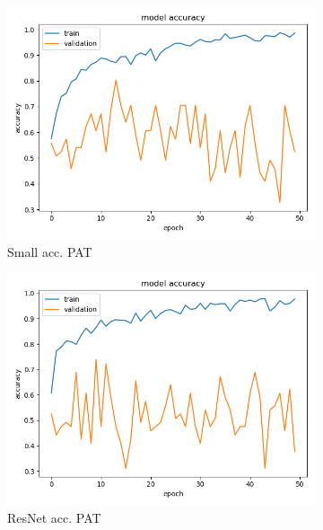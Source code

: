 \begin{figure}[h]
\begin{subfigure}[b]{.24\linewidth}
\includegraphics[width=\linewidth]{Figs/small_pat_acc.jpg}
\caption{Small acc. PAT}
\end{subfigure}
\begin{subfigure}[b]{.24\linewidth}
\includegraphics[width=\linewidth]{Figs/resnet_pat_acc.jpg}
\caption{ResNet acc. PAT}
\end{subfigure}
\begin{subfigure}[b]{.24\linewidth}

\end{subfigure}
\end{figure}
